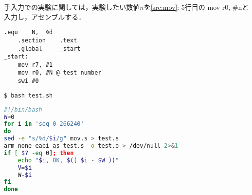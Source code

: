 手入力での実験に関しては，実験したい数値\(n\)を\ref{src:mov}: 5行目の {\ttfamily mov r0, \#n}と入力し，アセンブルする．
\begin{center}
    \begin{minipage}[t]{0.34\textwidth}
        \centering
        \begin{lstlisting}[caption={{\ttfamily mov.s}変更後},label={src:mov2},frame={left}]
    .equ    N,  %d
    .section    .text
    .global     _start
_start:
    mov r7, #1
    mov r0, #N @ test number
    swi #0
    \end{lstlisting}
        \begin{lstlisting}[language={Bash},numbers={none},caption={実行},label={src:testexec},frame={leftline}]
$ bash test.sh          
    \end{lstlisting}
    \end{minipage}
    \hspace{2em}
    \begin{minipage}[t]{0.58\textwidth}
        \centering
        \begin{lstlisting}[language={Bash},caption={{\ttfamily test.sh}},label={src:test},frame={left}]
#!/bin/bash
W=0
for i in 'seq 0 266240'
do
sed -e "s/%d/$i/g" mov.s > test.s
arm-none-eabi-as test.s -o test.o > /dev/null 2>&1
if [ $? -eq 0]; then
    echo "$i, OK, $(( $i - $W ))"
    V=$i
    W-$i
fi
done
    \end{lstlisting}
    \end{minipage}
\end{center}
